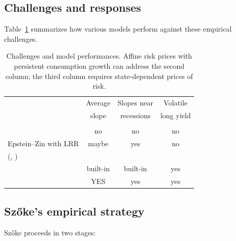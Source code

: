 \documentclass[12pt]{article}
\theoremstyle{definition}
\begin{document}
\subsection{Challenges and responses}

Table~\ref{tab:challenges} summarizes how various models perform against
these empirical challenges.

\begin{table}[H]
\begin{center}
\begin{tabular}{lccc}
& Average   & Slopes near  & Volatile\\
& slope    & recessions & long yield \\
\hline\\[-6pt]
\citealt{Lucas1978}  &  no & no & no \\[4pt]
Epstein--Zin with LRR & maybe & yes & no \\
\quad (\citealt{PS2007}, \citealt{HS2001}) & & & \\[4pt]
\citealt{PSS2015} &  built-in  &  built-in & yes \\[4pt]
\citealt{Szoke2022} & YES  & yes & yes \\[4pt]
\end{tabular}
\end{center}
\caption{Challenges and model performances.  Affine risk prices with
persistent consumption growth can address the second column; the third
column requires state-dependent prices of risk.}
\label{tab:challenges}
\end{table}

\subsection{Sz\H{o}ke's empirical strategy}

Sz\H{o}ke proceeds in two stages:
\end{document}
